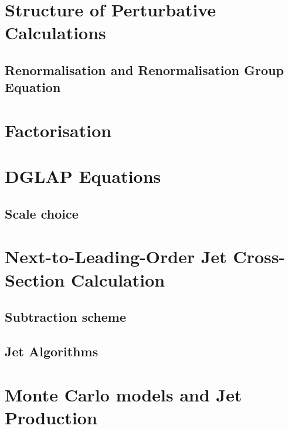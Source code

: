 \section{Structure of Perturbative Calculations}


\subsection{Renormalisation and Renormalisation Group Equation}


\section{Factorisation}


\section{DGLAP Equations}


\subsection{Scale choice}


\section{Next-to-Leading-Order Jet Cross-Section Calculation}


\subsection{Subtraction scheme}
\label{subsec:subscheme}

 
\subsection{Jet Algorithms}
\label{subsec:jetalgo}

%

\section{Monte Carlo models and Jet Production}
